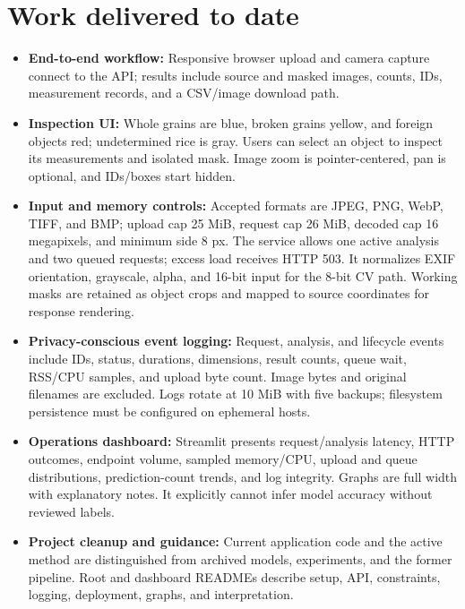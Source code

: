 \documentclass[10pt,a4paper]{article}
\begin{document}
\newpage
\section{Work delivered to date}
\begin{itemize}
  \item \textbf{End-to-end workflow:} Responsive browser upload and camera capture connect to the API; results include source and masked images, counts, IDs, measurement records, and a CSV/image download path.
  \item \textbf{Inspection UI:} Whole grains are blue, broken grains yellow, and foreign objects red; undetermined rice is gray. Users can select an object to inspect its measurements and isolated mask. Image zoom is pointer-centered, pan is optional, and IDs/boxes start hidden.
  \item \textbf{Input and memory controls:} Accepted formats are JPEG, PNG, WebP, TIFF, and BMP; upload cap 25 MiB, request cap 26 MiB, decoded cap 16 megapixels, and minimum side 8 px. The service allows one active analysis and two queued requests; excess load receives HTTP 503. It normalizes EXIF orientation, grayscale, alpha, and 16-bit input for the 8-bit CV path. Working masks are retained as object crops and mapped to source coordinates for response rendering.
  \item \textbf{Privacy-conscious event logging:} Request, analysis, and lifecycle events include IDs, status, durations, dimensions, result counts, queue wait, RSS/CPU samples, and upload byte count. Image bytes and original filenames are excluded. Logs rotate at 10 MiB with five backups; filesystem persistence must be configured on ephemeral hosts.
  \item \textbf{Operations dashboard:} Streamlit presents request/analysis latency, HTTP outcomes, endpoint volume, sampled memory/CPU, upload and queue distributions, prediction-count trends, and log integrity. Graphs are full width with explanatory notes. It explicitly cannot infer model accuracy without reviewed labels.
  \item \textbf{Project cleanup and guidance:} Current application code and the active method are distinguished from archived models, experiments, and the former pipeline. Root and dashboard READMEs describe setup, API, constraints, logging, deployment, graphs, and interpretation.
\end{itemize}
\end{document}
